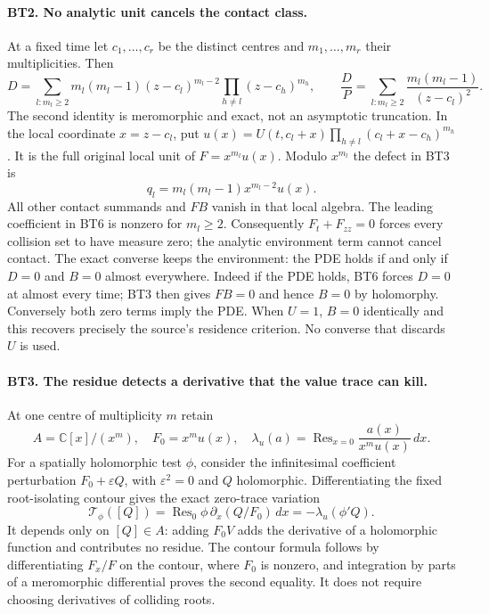 \documentclass[11pt,a4paper]{article}
\theoremstyle{definition}\newtheorem{definition}[theorem]{Definition}
\begin{document}
\paragraph{BT2. No analytic unit cancels the contact class.}
At a fixed time let $c_1,\ldots,c_r$ be the distinct centres and
$m_1,\ldots,m_r$ their multiplicities. Then
\[
 D=\sum_{l:m_l\ge2}m_l(m_l-1)(z-c_l)^{m_l-2}
                  \prod_{h\ne l}(z-c_h)^{m_h},\qquad
 \frac DP=\sum_{l:m_l\ge2}\frac{m_l(m_l-1)}{(z-c_l)^2}.
 \tag{BT5}
\]
The second identity is meromorphic and exact, not an asymptotic
truncation. In the local coordinate $x=z-c_l$, put
$u(x)=U(t,c_l+x)\prod_{h\ne l}(c_l+x-c_h)^{m_h}$.
It is the full original local unit of $F=x^{m_l}u(x)$. Modulo
$x^{m_l}$ the defect in BT3 is
\[
 q_l=m_l(m_l-1)x^{m_l-2}u(x).
 \tag{BT6}
\]
All other contact summands and $FB$ vanish in that local algebra.
The leading coefficient in BT6 is nonzero for $m_l\ge2$.
Consequently $F_t+F_{zz}=0$ forces every collision set to have
measure zero; the analytic environment term cannot cancel contact.
The exact converse keeps the environment: the PDE holds if and only
if $D=0$ and $B=0$ almost everywhere. Indeed if the PDE holds, BT6
forces $D=0$ at almost every time; BT3 then gives $FB=0$ and hence
$B=0$ by holomorphy. Conversely both zero terms imply the PDE.
When $U=1$, $B=0$ identically and this recovers precisely the
source's residence criterion. No converse that discards $U$ is used.

\paragraph{BT3. The residue detects a derivative that the value trace can kill.}
At one centre of multiplicity $m$ retain
\[
 A=\mathbb C[x]/(x^m),\quad F_0=x^mu(x),\quad
 \lambda_u(a)=\operatorname{Res}_{x=0}\frac{a(x)}{x^mu(x)}\,dx.
 \tag{BT7}
\]
For a spatially holomorphic test $\phi$, consider the infinitesimal
coefficient perturbation $F_0+\varepsilon Q$, with
$\varepsilon^2=0$ and $Q$ holomorphic. Differentiating the fixed
root-isolating contour gives the exact zero-trace variation
\[
 \mathcal T_\phi([Q])
  =\operatorname{Res}_{0}\phi\,\partial_x(Q/F_0)\,dx
  =-\lambda_u(\phi'Q).
 \tag{BT8}
\]
It depends only on $[Q]\in A$: adding $F_0V$ adds the derivative
of a holomorphic function and contributes no residue. The contour
formula follows by differentiating $F_x/F$ on the contour, where
$F_0$ is nonzero, and integration by parts of a meromorphic
differential proves the second equality. It does not require
choosing derivatives of colliding roots.
\end{document}
